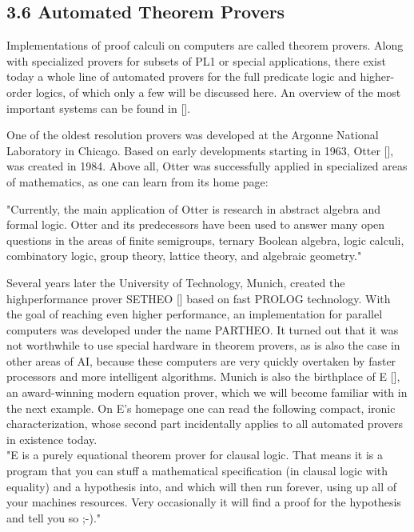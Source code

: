 \documentclass[10pt]{article}
\begin{document}
\subsection*{3.6 Automated Theorem Provers}
Implementations of proof calculi on computers are called theorem provers. Along with specialized provers for subsets of PL1 or special applications, there exist today a whole line of automated provers for the full predicate logic and higher-order logics, of which only a few will be discussed here. An overview of the most important systems can be found in [\cite{mccune_automated_deduction_systems}].

One of the oldest resolution provers was developed at the Argonne National Laboratory in Chicago. Based on early developments starting in 1963, Otter [\cite{kalman2001automated}], was created in 1984. Above all, Otter was successfully applied in specialized areas of mathematics, as one can learn from its home page:

\begin{displayquote}
"Currently, the main application of Otter is research in abstract algebra and formal logic. Otter and its predecessors have been used to answer many open questions in the areas of finite semigroups, ternary Boolean algebra, logic calculi, combinatory logic, group theory, lattice theory, and algebraic geometry."
\end{displayquote}

Several years later the University of Technology, Munich, created the highperformance prover SETHEO [\cite{letz1992setheo}] based on fast PROLOG technology. With the goal of reaching even higher performance, an implementation for parallel computers was developed under the name PARTHEO. It turned out that it was not worthwhile to use special hardware in theorem provers, as is also the case in other areas of AI, because these computers are very quickly overtaken by faster processors and more intelligent algorithms. Munich is also the birthplace of E [\cite{schulz2002e}], an award-winning modern equation prover, which we will become familiar with in the next example. On E's homepage one can read the following compact, ironic characterization, whose second part incidentally applies to all automated provers in existence today.\\
"E is a purely equational theorem prover for clausal logic. That means it is a program that you can stuff a mathematical specification (in clausal logic with equality) and a hypothesis into, and which will then run forever, using up all of your machines resources. Very occasionally it will find a proof for the hypothesis and tell you so ;-)."
\end{document}
